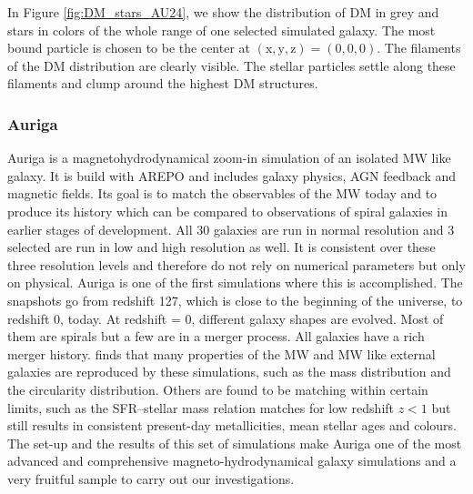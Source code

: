 In Figure \ref{fig:DM_stars_AU24}, we show the distribution of \ac{DM} in grey and stars in colors of the whole range of one selected simulated galaxy. The most bound particle is chosen to be the center at $(\mathrm{x,y,z}) = (0,0,0)$. The filaments of the \ac{DM} distribution are clearly visible. The stellar particles settle along these filaments and clump around the highest \ac{DM} structures. 

\subsubsection{Auriga}\label{subsubsec:auriga_intro}
Auriga is a magnetohydrodynamical zoom-in simulation of an isolated \ac{MW} like galaxy. It is build with AREPO \citep{AREPO} and includes galaxy physics, \ac{AGN} feedback and magnetic fields. Its goal is to match the observables of the \ac{MW} today and to produce its history which can be compared to observations of spiral galaxies in earlier stages of development. All 30 galaxies are run in normal resolution and 3 selected are run in low and high resolution as well. It is consistent over these three resolution levels and therefore do not rely on numerical parameters but only on physical. Auriga is one of the first simulations where this is accomplished. The snapshots go from redshift 127, which is close to the beginning of the universe, to redshift 0, today.  At redshift = 0, different galaxy shapes are evolved. Most of them are spirals but a few are in a merger process. All galaxies have a rich merger history. \citep{AurigaGrand} finds that many properties of the \ac{MW} and \ac{MW} like external galaxies are reproduced by these simulations, such as the mass distribution and the circularity distribution. Others are found to be matching within certain limits, such as the SFR–stellar mass relation matches for low redshift $z<1$ but still results in consistent present-day metallicities, mean stellar ages and colours. The set-up and the results of this set of simulations make Auriga one of the most advanced and comprehensive magneto-hydrodynamical galaxy simulations and a very fruitful sample to carry out our investigations. \\
